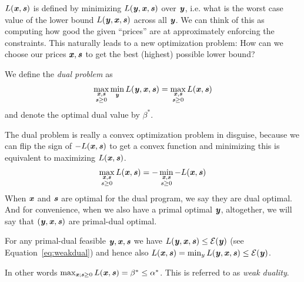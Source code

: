 $L(\xx, \ss)$ is defined by minimizing $L(\yy,\xx,\ss)$ over $\yy$,
i.e. what is the worst case value of the lower bound $L(\yy,\xx,\ss)$
across all $\yy$.
We can think of this as computing how good the given ``prices'' are at
approximately enforcing the constraints.
This naturally leads to a new optimization problem: How can we choose
our prices $\xx, \ss$ to get the best (highest) possible lower bound?

\begin{definition}
We define the \emph{dual problem} as
\begin{align}
  \label{eq:dualprob}
  \max_{\substack{\xx, \ss \\ \ss \geq 0}}
  \min_{\yy}L(\yy, \xx, \ss)
  =
  \max_{\substack{\xx, \ss \\ \ss \geq 0}} L(\xx,  \ss)
  \end{align}
and denote the optimal dual value by $\beta^*$.
\end{definition}

The dual problem is really a convex optimization
problem in disguise, because we can flip the sign of $-L(\xx,  \ss)$
to get a convex function and minimizing this is equivalent to
maximizing $L(\xx,  \ss)$.
\begin{align*}
  \max_{\substack{\xx, \ss \\ \ss \geq 0}} L(\xx,  \ss)
  =
  -
  \min_{\substack{\xx, \ss \\ \ss \geq 0}} -L(\xx,  \ss)
\end{align*}
When $\xx$ and $\ss$ are optimal for the dual program, we
say they are dual optimal. And for convenience, when we also have a
primal optimal $\yy$, altogether, we will say that $(\yy,\xx,\ss)$ are
primal-dual optimal.



For any primal-dual feasible $\yy,\xx,\ss$ we have
$L(\yy, \xx, \ss) \leq \energy(\yy)$ (see Equation~\eqref{eq:weakdual}) and hence also $L(\xx, \ss) = \min_y L(\yy, \xx, \ss) \leq \energy(\yy)$.

In other words $\max_{\xx; \ss \geq 0} L(\xx, \ss) = \beta^* \leq \alpha^*$.
This is referred to as \emph{weak duality}.

